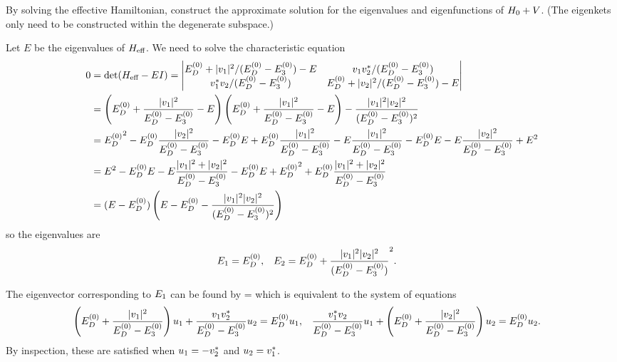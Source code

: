 \clearpage
\newcommand{\uq}{u_1}
\newcommand{\uw}{u_2}
\newcommand{\wq}{w_1}
\newcommand{\ww}{w_2}

\begin{problem}
	By solving the effective Hamiltonian, construct the approximate solution for the eigenvalues and eigenfunctions of $H_0 + V$.  (The eigenkets only need to be constructed within the degenerate subspace.)
\end{problem}

\begin{solution}
	Let $E$ be the eigenvalues of $H_\text{eff}$.  We need to solve the characteristic equation
	\begin{align*}
		0 &= \det(\Heff - E I)
		= \vmqty{ \Eod + |\vq|^2/(\Eod - \Eoe) - E & \vq \vws / (\Eod - \Eoe) \\ \vqs \vw / (\Eod - \Eoe) & \Eod + |\vw|^2/(\Eod - \Eoe) - E } \\
		&= \left( \Eod + \frac{|\vq|^2}{\Eod - \Eoe} - E \right) \left( \Eod + \frac{|\vq|^2}{\Eod - \Eoe} - E \right) - \frac{|\vq|^2 |\vw|^2}{(\Eod - \Eoe)^2} \\
		&= {\Eod}^2 - \Eod \frac{|\vw|^2}{\Eod - \Eoe} - \Eod E + \Eod \frac{|\vq|^2}{\Eod - \Eoe} - E \frac{|\vq|^2}{\Eod - \Eoe} - \Eod E - E \frac{|\vw|^2}{\Eod - \Eoe} + E^2 \\
		&= E^2 - \Eod E - E \frac{|\vq|^2 + |\vw|^2}{\Eod - \Eoe} - \Eod E + {\Eod}^2 + \Eod \frac{|\vq|^2 + |\vw|^2}{\Eod - \Eoe} \\
		&= (E - \Eod) \left( E - \Eod - \frac{|\vq|^2 |\vw|^2}{(\Eod - \Eoe)^2} \right)
	\end{align*}
	so the eigenvalues are
	\begin{align*}
		E_1 &= E^{(0)}_D, &
		E_2 &= E^{(0)}_D + \frac{|v_1|^2 |v_2|^2}{(E^{(0)}_D - E^{(0)}_3)}^2.
	\end{align*}
	
	The eigenvector corresponding to $E_1$ can be found by
	\beq
		 \mqty[ \uq \\ \uw ] = \Eod \mqty[ \uq \\ \uw ]
	\eeq
	which is equivalent to the system of equations
	\begin{align*}
		\left( \Eod + \frac{|\vq|^2}{\Eod - \Eoe} \right) \uq + \frac{\vq \vws}{\Eod - \Eoe} \uw &= \Eod \uq, &
		\frac{\vqs \vw}{\Eod - \Eoe} \uq + \left( \Eod + \frac{|\vw|^2}{\Eod - \Eoe} \right) \uw &= \Eod \uw.
	\end{align*}
	By inspection, these are satisfied when $\uq = -\vws$ and $\uw = \vqs$.
	

\end{solution}
